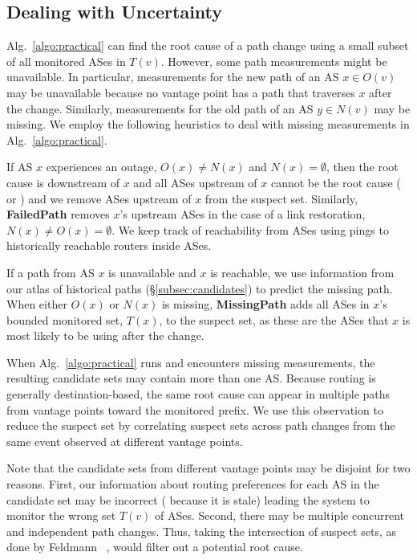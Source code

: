 \subsection{Dealing with Uncertainty}
\label{subsec:uncertainty}

Alg.~\ref{algo:practical} can find the root cause of a path change
using a small subset of all monitored ASes in $T(v)$.  However,
some path measurements might be unavailable.  In particular,
measurements for the new path of an AS $x \in O(v)$ may be unavailable 
because no vantage point has a path that traverses $x$ after the change.
Similarly, measurements for the old path of an AS $y \in N(v)$ may be
missing.  We employ the following heuristics to deal with missing
measurements in Alg.~\ref{algo:practical}.

  If AS $x$ experiences an outage, \ie $O(x) \ne
N(x)$ and $N(x) = \emptyset$, then the root cause is downstream of $x$
and all ASes upstream of $x$ cannot be the root cause (\localC{} or
\neighborC{}) and we remove ASes upstream of $x$ from the suspect set.
Similarly, \textbf{FailedPath} removes $x$'s upstream ASes in the case
of a link restoration, \ie $N(x) \ne O(x) = \emptyset$.  We keep track
of reachability from ASes using pings to historically reachable routers
inside ASes.

 If a path from AS $x$ is unavailable and $x$
is reachable, we use information from our atlas of historical paths
(\S\ref{subsec:candidates}) to predict the missing path.  When either
$O(x)$ or $N(x)$ is missing, \textbf{MissingPath} adds all ASes in $x$'s
bounded monitored set, $T(x)$, to the suspect set, as these are the ASes
that $x$ is most likely to be using after the change.

\vspace{0.4em}
%
 When Alg.~\ref{algo:practical} runs and 
encounters missing measurements, the resulting candidate sets may
contain more than one AS.  Because routing is generally destination-based, 
the same root cause can appear in multiple paths from vantage points toward 
the monitored prefix. We use this observation to reduce the suspect set by correlating
suspect sets across path changes from the same event observed at
different vantage points. 

Note that the candidate sets from different vantage points may be
disjoint for two reasons. First, our information about routing
preferences for each AS in the candidate set may be incorrect (\eg
because it is stale) leading the system to monitor the wrong set $T(v)$
of ASes. Second, there may be multiple concurrent and independent path
changes.  Thus, taking the intersection of suspect sets, as done by
Feldmann \etal~\cite{feldman}, would filter out a potential root cause. 

